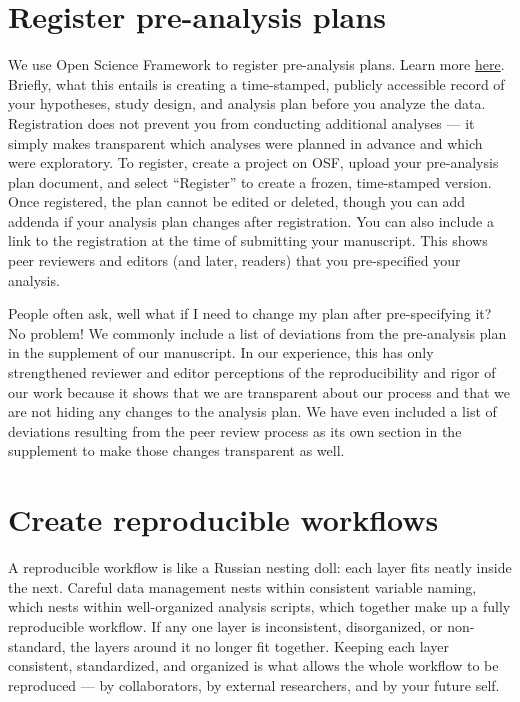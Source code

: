 \documentclass[
]{book}
\begin{document}
\section{Register pre-analysis plans}\label{register-pre-analysis-plans}

We use Open Science Framework to register pre-analysis plans. Learn more \href{https://www.cos.io/initiatives/prereg}{here}. Briefly, what this entails is creating a time-stamped, publicly accessible record of your hypotheses, study design, and analysis plan before you analyze the data. Registration does not prevent you from conducting additional analyses --- it simply makes transparent which analyses were planned in advance and which were exploratory. To register, create a project on OSF, upload your pre-analysis plan document, and select ``Register'' to create a frozen, time-stamped version. Once registered, the plan cannot be edited or deleted, though you can add addenda if your analysis plan changes after registration. You can also include a link to the registration at the time of submitting your manuscript. This shows peer reviewers and editors (and later, readers) that you pre-specified your analysis.

People often ask, well what if I need to change my plan after pre-specifying it? No problem! We commonly include a list of deviations from the pre-analysis plan in the supplement of our manuscript. In our experience, this has only strengthened reviewer and editor perceptions of the reproducibility and rigor of our work because it shows that we are transparent about our process and that we are not hiding any changes to the analysis plan. We have even included a list of deviations resulting from the peer review process as its own section in the supplement to make those changes transparent as well.

\section{Create reproducible workflows}\label{create-reproducible-workflows}

A reproducible workflow is like a Russian nesting doll: each layer fits neatly inside the next. Careful data management nests within consistent variable naming, which nests within well-organized analysis scripts, which together make up a fully reproducible workflow. If any one layer is inconsistent, disorganized, or non-standard, the layers around it no longer fit together. Keeping each layer consistent, standardized, and organized is what allows the whole workflow to be reproduced --- by collaborators, by external researchers, and by your future self.
\end{document}
